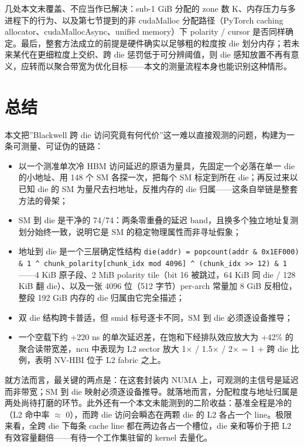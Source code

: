 几处本文未覆盖、不应当作已解决：sub-1 GiB 分配的 zone 数 K、内存压力与多进程下的行为、以及第七节提到的非 cudaMalloc 分配路径（PyTorch caching allocator、cudaMallocAsync、unified memory）下 polarity / cursor 是否同样确定。最后，整套方法成立的前提是硬件确实以足够粗的粒度按 die 划分内存；若未来某代在更细粒度上交织、跨 die 惩罚低于可分辨阈值，则 die 感知放置不再有意义，应转而以聚合带宽为优化目标——本文的测量流程本身也能识别这种情形。

\section{总结}

本文把”Blackwell 跨 die 访问究竟有何代价”这一难以直接观测的问题，构建为一条可测量、可证伪的链路：

\begin{itemize}
  \item 以一个测准单次冷 HBM 访问延迟的原语为量具，先固定一个必落在单一 die 的小地址、用 148 个 SM 各探一次，把每个 SM 标定到所在 die；再反过来以已知 die 的 SM 为量尺去扫地址，反推内存的 die 归属——这条自举链是整套方法的骨架；
  \item SM 到 die 是干净的 74/74：两条零重叠的延迟 band，且换多个独立地址复测划分始终一致，说明它是 SM 的稳定物理属性而非寻址假象；
  \item 地址到 die 是一个三层确定性结构 \lstinline|die(addr) = popcount(addr & 0x1EF000) & 1 ^ chunk_polarity[chunk_idx mod 4096] ^ (chunk_idx >> 12) & 1|——4 KiB 原子段、2 MiB polarity tile（bit 16 被跳过，64 KiB 同 die / 128 KiB 翻 die）、以及一张 4096 位（512 字节）per-arch 常量加 8 GiB 反相位，整段 192 GiB 内存的 die 归属由它完全描述；
  \item 双 die 结构跨卡普适，但 smid 标号逐卡不同，SM 到 die 必须逐设备推导；
  \item 一个空载下约 +220 ns 的单次延迟差，在饱和下经排队效应放大为 +42\% 的聚合读带宽差，ncu 中表现为 L2 sector 放大 1$\times$ / 1.5$\times$ / 2$\times$ = 1 + 跨 die 比例，表明 NV-HBI 位于 L2 fabric 之上。
\end{itemize}

就方法而言，最关键的两点是：在这套封装内 NUMA 上，可观测的主信号是延迟而非带宽；SM 到 die 映射必须逐设备推导。就落地而言，分配粒度与地址归属是两处尚待打磨的环节。此外还有一个本文未能测到的二阶收益：基准全程是冷的（L2 命中率 $\approx$ 0），而跨 die 访问会瞬态在两颗 die 的 L2 各占一个 line。极限来看，全跨 die 下每条 cache line 都在两边各占一个槽位，die 亲和等价于把 L2 有效容量翻倍——有待一个工作集驻留的 kernel 去量化。

